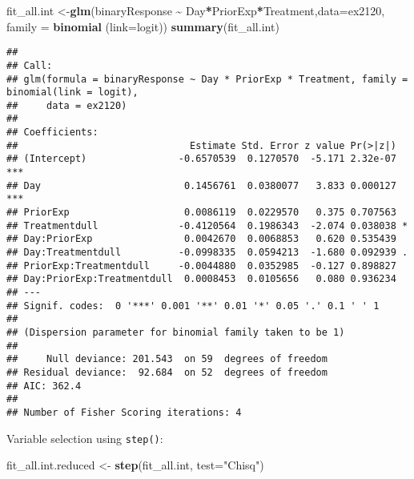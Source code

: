 \documentclass[
]{article}
\newenvironment{Shaded}{\begin{snugshade}}{\end{snugshade}}
\newcommand{\AttributeTok}[1]{\textcolor[rgb]{0.13,0.29,0.53}{#1}}
\newcommand{\FunctionTok}[1]{\textcolor[rgb]{0.13,0.29,0.53}{\textbf{#1}}}
\newcommand{\NormalTok}[1]{#1}
\newcommand{\OtherTok}[1]{\textcolor[rgb]{0.56,0.35,0.01}{#1}}
\newcommand{\SpecialCharTok}[1]{\textcolor[rgb]{0.81,0.36,0.00}{\textbf{#1}}}
\newcommand{\StringTok}[1]{\textcolor[rgb]{0.31,0.60,0.02}{#1}}
\begin{document}
\begin{Shaded}
\begin{Highlighting}[]
\NormalTok{fit\_all.int }\OtherTok{\textless{}{-}}\FunctionTok{glm}\NormalTok{(binaryResponse }\SpecialCharTok{\textasciitilde{}}\NormalTok{ Day}\SpecialCharTok{*}\NormalTok{PriorExp}\SpecialCharTok{*}\NormalTok{Treatment,}\AttributeTok{data=}\NormalTok{ex2120, }\AttributeTok{family =} \FunctionTok{binomial}\NormalTok{ (}\AttributeTok{link=}\NormalTok{logit))}
\FunctionTok{summary}\NormalTok{(fit\_all.int)}
\end{Highlighting}
\end{Shaded}

\begin{verbatim}
## 
## Call:
## glm(formula = binaryResponse ~ Day * PriorExp * Treatment, family = binomial(link = logit), 
##     data = ex2120)
## 
## Coefficients:
##                              Estimate Std. Error z value Pr(>|z|)    
## (Intercept)                -0.6570539  0.1270570  -5.171 2.32e-07 ***
## Day                         0.1456761  0.0380077   3.833 0.000127 ***
## PriorExp                    0.0086119  0.0229570   0.375 0.707563    
## Treatmentdull              -0.4120564  0.1986343  -2.074 0.038038 *  
## Day:PriorExp                0.0042670  0.0068853   0.620 0.535439    
## Day:Treatmentdull          -0.0998335  0.0594213  -1.680 0.092939 .  
## PriorExp:Treatmentdull     -0.0044880  0.0352985  -0.127 0.898827    
## Day:PriorExp:Treatmentdull  0.0008453  0.0105656   0.080 0.936234    
## ---
## Signif. codes:  0 '***' 0.001 '**' 0.01 '*' 0.05 '.' 0.1 ' ' 1
## 
## (Dispersion parameter for binomial family taken to be 1)
## 
##     Null deviance: 201.543  on 59  degrees of freedom
## Residual deviance:  92.684  on 52  degrees of freedom
## AIC: 362.4
## 
## Number of Fisher Scoring iterations: 4
\end{verbatim}

Variable selection using \texttt{step()}:

\begin{Shaded}
\begin{Highlighting}[]
\NormalTok{fit\_all.int.reduced }\OtherTok{\textless{}{-}} \FunctionTok{step}\NormalTok{(fit\_all.int, }\AttributeTok{test=}\StringTok{"Chisq"}\NormalTok{)}
\end{Highlighting}
\end{Shaded}
\end{document}

